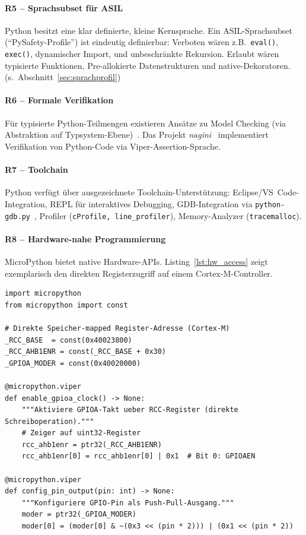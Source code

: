 ﻿\documentclass[12pt,a4paper,twoside]{article}
\begin{document}
\paragraph{R5 -- Sprachsubset für ASIL}
Python besitzt eine klar definierte, kleine Kernsprache.
Ein ASIL-Sprachsubset (``PySafety-Profile'') ist eindeutig definierbar:
Verboten wären z.B.\ \texttt{eval()}, \texttt{exec()}, dynamischer Import,
und unbeschränkte Rekursion. Erlaubt wären typisierte Funktionen,
Pre-allokierte Datenstrukturen und native-Dekoratoren.
(s.~Abschnitt~\ref{sec:sprachprofil})

\paragraph{R6 -- Formale Verifikation}
Für typisierte Python-Teilmengen existieren Ansätze zu
Model Checking (via Abstraktion auf Typsystem-Ebene)~\cite{gros2021python_types}.
Das Projekt \emph{nagini}~\cite{nagini2018} implementiert
Verifikation von Python-Code via Viper-Assertion-Sprache.

\paragraph{R7 -- Toolchain}
Python verfügt über ausgezeichnete Toolchain-Unterstützung:
Eclipse/VS~Code-Integration, REPL für interaktives Debugging,
GDB-Integration via \texttt{python-\newline gdb.py}~\cite{cpython_gdb},
Profiler (\texttt{cProfile, line\_profiler}), Memory-Analyzer (\texttt{tracemalloc}).

\paragraph{R8 -- Hardware-nahe Programmierung}
MicroPython bietet native Hardware-APIs. Listing~\ref{lst:hw_access}
zeigt exemplarisch den direkten Registerzugriff auf einem Cortex-M-Controller.

\begin{lstlisting}[language=MicroPython,caption={Direkter Hardware-Registerzugriff mit MicroPython},label=lst:hw_access]
import micropython
from micropython import const

# Direkte Speicher-mapped Register-Adresse (Cortex-M)
_RCC_BASE  = const(0x40023800)
_RCC_AHB1ENR = const(_RCC_BASE + 0x30)
_GPIOA_MODER = const(0x40020000)

@micropython.viper
def enable_gpioa_clock() -> None:
    """Aktiviere GPIOA-Takt ueber RCC-Register (direkte Schreiboperation)."""
    # Zeiger auf uint32-Register
    rcc_ahb1enr = ptr32(_RCC_AHB1ENR)
    rcc_ahb1enr[0] = rcc_ahb1enr[0] | 0x1  # Bit 0: GPIOAEN

@micropython.viper  
def config_pin_output(pin: int) -> None:
    """Konfiguriere GPIO-Pin als Push-Pull-Ausgang."""
    moder = ptr32(_GPIOA_MODER)
    moder[0] = (moder[0] & ~(0x3 << (pin * 2))) | (0x1 << (pin * 2))
\end{lstlisting}
\end{document}
